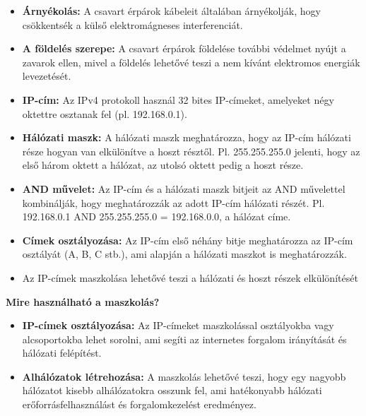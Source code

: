 \documentclass[12pt,a4paper]{article}
\begin{document}
\begin{tcolorbox}[colback=blue!5!white,colframe=blue!50!black,title= 42. Ismertesse az ethernet hálózaton használt eszközöket!]
\begin{itemize}
                                            \item \textbf{Árnyékolás:} A csavart érpárok kábeleit általában árnyékolják, hogy csökkentsék a külső elektromágneses interferenciát.
                                            \item \textbf{A földelés szerepe:} A csavart érpárok földelése további védelmet nyújt a zavarok ellen, mivel a földelés lehetővé teszi a nem kívánt elektromos energiák levezetését.
                                        \end{itemize}
            \end{tcolorbox}
            
            \begin{tcolorbox}[colback=blue!5!white,colframe=blue!50!black,title= 43. Ismertesse az internetes címek maszkolási algoritmusát!]
                \begin{itemize}
                    \item \textbf{IP-cím:} Az IPv4 protokoll használ 32 bites IP-címeket, amelyeket négy oktettre osztanak fel (pl. 192.168.0.1).
                    \item \textbf{Hálózati maszk:} A hálózati maszk meghatározza, hogy az IP-cím hálózati része hogyan van elkülönítve a hoszt résztől. Pl. 255.255.255.0 jelenti, hogy az első három oktett a hálózat, az utolsó oktett pedig a hoszt része.
                    \item \textbf{AND művelet:} Az IP-cím és a hálózati maszk bitjeit az AND művelettel kombinálják, hogy meghatározzák az adott IP-cím hálózati részét. Pl. 192.168.0.1 AND 255.255.255.0 = 192.168.0.0, a hálózat címe.
                    \item \textbf{Címek osztályozása:} Az IP-cím első néhány bitje meghatározza az IP-cím osztályát (A, B, C stb.), ami alapján a hálózati maszkot is meghatározzák.
                    \item Az IP-címek maszkolása lehetővé teszi a hálózati és hoszt részek elkülönítését 
                \end{itemize}    
                \textbf{Mire használható a maszkolás?}
                \begin{itemize}
                    \item \textbf{IP-címek osztályozása:} Az IP-címeket maszkolással osztályokba vagy alcsoportokba lehet sorolni, ami segíti az internetes forgalom irányítását és hálózati felépítést.
                    \item \textbf{Alhálózatok létrehozása:} A maszkolás lehetővé teszi, hogy egy nagyobb hálózatot kisebb alhálózatokra osszunk fel, ami hatékonyabb hálózati erőforrásfelhasználást és forgalomkezelést eredményez.

\end{itemize}
\end{tcolorbox}
\end{document}
